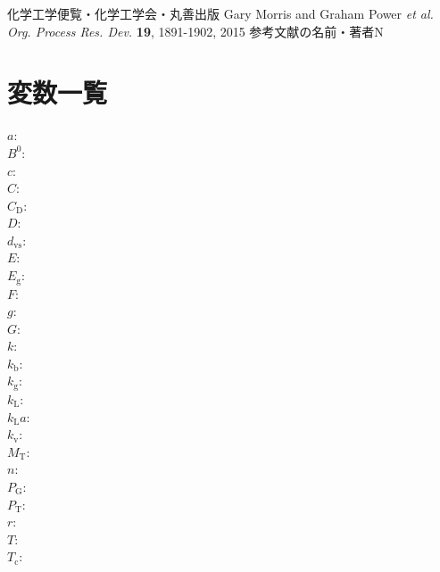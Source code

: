 \documentclass[a4j]{jsreport}
\begin{document}
\newpage
\begin{thebibliography}{10}
     化学工学便覧・化学工学会・丸善出版
     Gary Morris and  Graham Power {\it et al.  Org. Process Res. Dev.} {\bf 19}, 1891-1902, 2015
     参考文献の名前・著者N
\end{thebibliography}

\newpage
\chapter*{変数一覧}
\begin{multicols}{2}
\begin{flushleft}
    $a$: \\
    $B^0$:\\
    $c$:\\
    $C$:\\
    $C_{\mathrm{D}}$:\\
    $D$:\\
    $d_{\mathrm{vs}}$:\\
    $E$:\\
    $E_{\mathrm{g}}$:\\
    $F$:\\
    $g$:\\
    $G$:\\
    $k$:\\
    $k_{\mathrm{b}}$:\\
    $k_{\mathrm{g}}$:\\
    $k_{\mathrm{L}}$:\\
    $k_{\mathrm{L}}a$:\\
    $k_{\mathrm{v}}$:\\
    $M_{\mathrm{T}}$:\\
    $n$:\\
    $P_{\mathrm{G}}$:\\
    $P_{\mathrm{T}}$:\text{}\\
    $r$:\\
    $T$:\\
    $T_{\mathrm{c}}$:\\

\end{flushleft}
\end{multicols}
\end{document}
